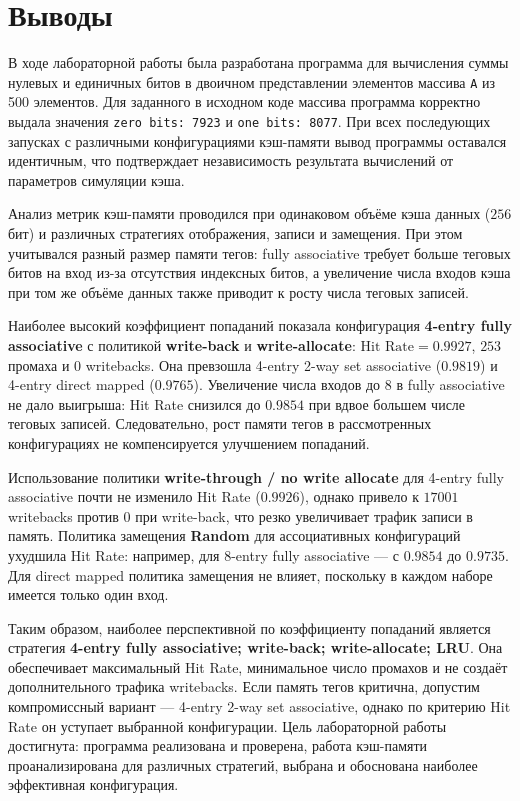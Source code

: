 \documentclass[12pt]{extarticle}
\begin{document}
\section{Выводы}

В ходе лабораторной работы была разработана программа для вычисления суммы
нулевых и единичных битов в двоичном представлении элементов массива
\texttt{A} из 500 элементов. Для заданного в исходном коде массива программа
корректно выдала значения \texttt{zero bits: 7923} и \texttt{one bits: 8077}.
При всех последующих запусках с различными конфигурациями кэш-памяти вывод
программы оставался идентичным, что подтверждает независимость результата
вычислений от параметров симуляции кэша.

Анализ метрик кэш-памяти проводился при одинаковом объёме кэша данных
(\(256\) бит) и различных стратегиях отображения, записи и замещения. При этом
учитывался разный размер памяти тегов: fully associative требует больше
теговых битов на вход из-за отсутствия индексных битов, а увеличение числа
входов кэша при том же объёме данных также приводит к росту числа теговых
записей.

Наиболее высокий коэффициент попаданий показала конфигурация
\textbf{4-entry fully associative} с политикой \textbf{write-back} и
\textbf{write-allocate}: \(\text{Hit Rate} = 0.9927\), \(253\) промаха и
\(0\) writebacks. Она превзошла 4-entry 2-way set associative
(\(0.9819\)) и 4-entry direct mapped (\(0.9765\)). Увеличение числа входов
до 8 в fully associative не дало выигрыша: Hit Rate снизился до \(0.9854\)
при вдвое большем числе теговых записей. Следовательно, рост памяти тегов
в рассмотренных конфигурациях не компенсируется улучшением попаданий.

Использование политики \textbf{write-through / no write allocate} для
4-entry fully associative почти не изменило Hit Rate (\(0.9926\)), однако
привело к \(17001\) writebacks против \(0\) при write-back, что резко
увеличивает трафик записи в память. Политика замещения \textbf{Random}
для ассоциативных конфигураций ухудшила Hit Rate: например, для 8-entry
fully associative — с \(0.9854\) до \(0.9735\). Для direct mapped политика
замещения не влияет, поскольку в каждом наборе имеется только один вход.

Таким образом, наиболее перспективной по коэффициенту попаданий является
стратегия \textbf{4-entry fully associative; write-back; write-allocate; LRU}.
Она обеспечивает максимальный Hit Rate, минимальное число промахов и не
создаёт дополнительного трафика writebacks. Если память тегов критична,
допустим компромиссный вариант — 4-entry 2-way set associative, однако по
критерию Hit Rate он уступает выбранной конфигурации. Цель лабораторной
работы достигнута: программа реализована и проверена, работа кэш-памяти
проанализирована для различных стратегий, выбрана и обоснована наиболее
эффективная конфигурация.
\end{document}
